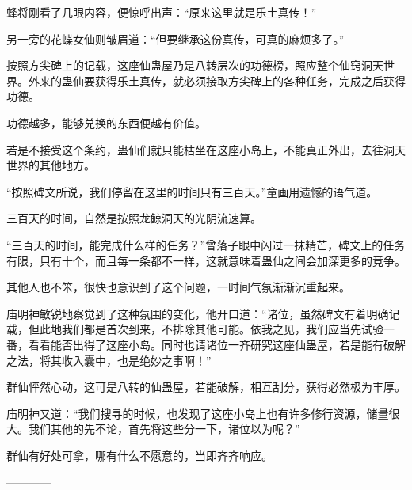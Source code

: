 \begin{this_body}
蜂将刚看了几眼内容，便惊呼出声：“原来这里就是乐土真传！”

另一旁的花蝶女仙则皱眉道：“但要继承这份真传，可真的麻烦多了。”

按照方尖碑上的记载，这座仙蛊屋乃是八转层次的功德榜，照应整个仙窍洞天世界。外来的蛊仙要获得乐土真传，就必须接取方尖碑上的各种任务，完成之后获得功德。

功德越多，能够兑换的东西便越有价值。

若是不接受这个条约，蛊仙们就只能枯坐在这座小岛上，不能真正外出，去往洞天世界的其他地方。

“按照碑文所说，我们停留在这里的时间只有三百天。”童画用遗憾的语气道。

三百天的时间，自然是按照龙鲸洞天的光阴流速算。

“三百天的时间，能完成什么样的任务？”曾落子眼中闪过一抹精芒，碑文上的任务有限，只有十个，而且每一条都不一样，这就意味着蛊仙之间会加深更多的竞争。

其他人也不笨，很快也意识到了这个问题，一时间气氛渐渐沉重起来。

庙明神敏锐地察觉到了这种氛围的变化，他开口道：“诸位，虽然碑文有着明确记载，但此地我们都是首次到来，不排除其他可能。依我之见，我们应当先试验一番，看看能否出得了这座小岛。同时也请诸位一齐研究这座仙蛊屋，若是能有破解之法，将其收入囊中，也是绝妙之事啊！”

群仙怦然心动，这可是八转的仙蛊屋，若能破解，相互刮分，获得必然极为丰厚。

庙明神又道：“我们搜寻的时候，也发现了这座小岛上也有许多修行资源，储量很大。我们其他的先不论，首先将这些分一下，诸位以为呢？”

群仙有好处可拿，哪有什么不愿意的，当即齐齐响应。

------------

\end{this_body}

